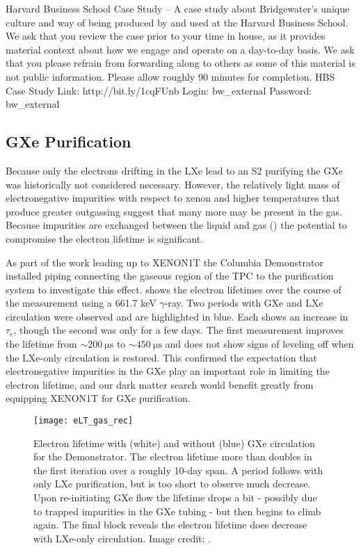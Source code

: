 Harvard Business School Case Study – A case study about Bridgewater’s unique culture and way of being produced by and used at the
Harvard Business School. We ask that you review the case prior to your time in house, as it provides material context about
how we engage and operate on a day-to-day basis.  We ask that you please refrain from forwarding along to others as some of this
material is not public information.   Please allow roughly 90 minutes for
completion.  HBS Case Study Link: http://bit.ly/1cqFUnb     Login: bw_external      Password: bw_external



\subsection{GXe Purification}
\label{subsec:electron_lifetime_model_gxe}
Because only the electrons drifting in the LXe lead to an S2 purifying the GXe was historically not considered necessary.  However,
the relatively light mass of electronegative impurities with respect to xenon and higher temperatures that produce greater outgassing
suggest that many more may be present in the gas.  Because
impurities are exchanged between the liquid and gas () the potential to compromise
the electron lifetime is significant.

As part of the work leading up to XENON1T the Columbia Demonstrator installed piping connecting the gaseous region of the TPC to the
purification system to investigate this effect.   shows the electron lifetimes over
the course of the measurement using a  661.7 keV $\gamma$-ray.  Two periods with GXe and LXe circulation were observed and
are highlighted in blue.  Each shows an increase in
$\tau_e$, though the second was only for a few days.  The first measurement improves the lifetime from
${\sim} 200\ \mathrm{\mu s}$ to ${\sim} 450\ \mathrm{\mu s}$ and does not show signs of leveling off when the LXe-only circulation is
restored.  This confirmed the expectation that electronegative impurities in the GXe play an important role in limiting the electron
lifetime, and our dark matter search would benefit greatly from equipping XENON1T for GXe purification.

\begin{figure}
\centering
\texttt{[image: eLT\_gas\_rec]}
\caption{Electron lifetime with (white) and without (blue) GXe circulation for the Demonstrator.  The electron lifetime more than doubles
in the first iteration over a roughly 10-day span.  A period follows with
only LXe purification, but is too short to observe much decrease.  Upon re-initiating GXe flow the lifetime drops a bit - possibly due to
trapped impurities in the GXe tubing - but then begins to climb again.  The final block reveals the electron lifetime does
decrease with LXe-only circulation.  Image credit: .}
\label{fig:electron_lifetime_model_gxe_demonstrator}
\end{figure}

